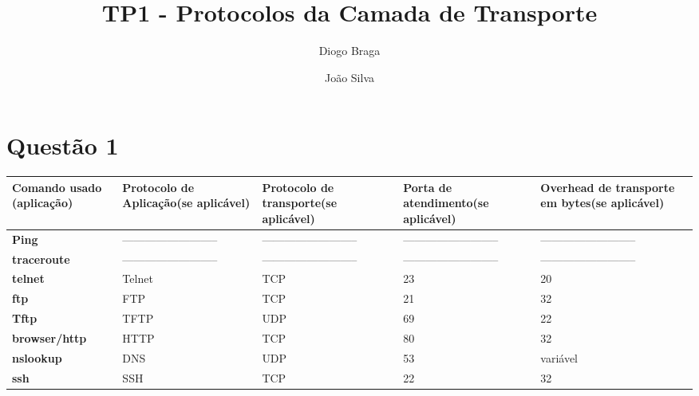 \documentclass{llncs}
\begin{document}
\mainmatter
\title{TP1 - Protocolos da Camada de Transporte}


\author{Diogo Braga \and João Silva}



\date{}


\maketitle

\section{Questão 1}

\begin{center}
\begin{tabular}{ | m{3cm} | m{3cm} | m{3cm} | m{3cm} | m{3cm} |}
\hline
 \textbf{Comando usado (aplicação)} & \textbf{Protocolo de Aplicação(se aplicável)} & \textbf{Protocolo de transporte(se aplicável)} & \textbf{Porta de atendimento(se aplicável)} & \textbf{Overhead de transporte em bytes(se aplicável)} \\
 \hline
 \textbf{Ping} & -------------------------- & -------------------------- & -------------------------- & -------------------------- \\
 \hline
 \textbf{traceroute} & -------------------------- & -------------------------- & -------------------------- & -------------------------- \\
 \hline
 \textbf{telnet} & Telnet & TCP & 23 & 20 \\
 \hline
 \textbf{ftp} & FTP & TCP & 21 & 32 \\
 \hline
 \textbf{Tftp} & TFTP & UDP & 69 & 22 \\
 \hline
 \textbf{browser/http} & HTTP & TCP & 80 & 32 \\
 \hline
 \textbf{nslookup} & DNS & UDP & 53 & variável \\
 \hline
 \textbf{ssh} & SSH & TCP & 22 & 32 \\
 \hline
\end{tabular}
\end{center}
\end{document}
